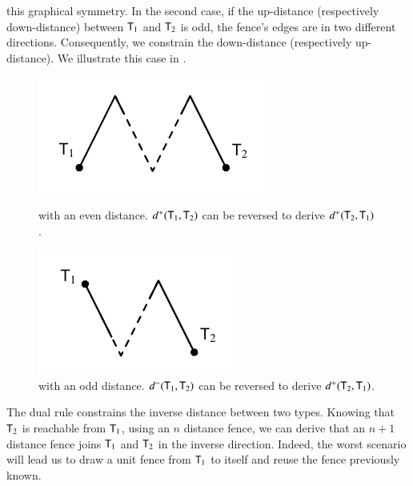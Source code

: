 \documentclass{report}
\begin{document}
  this graphical symmetry. In the second case, if the up-distance
  (respectively down-distance) between $\textsf{T}_1$ and $\textsf{T}_2$ is odd, the fence's edges
  are in two different directions. Consequently, we constrain the down-distance (respectively
  up-distance). We illustrate this case in .
  \begin{figure}[ht]
    \centering
    \begin{minipage}[b]{0.4\linewidth}
      \centering
      \includegraphics{images/dcsymm_even}
      \caption{\dcsymm with an even distance.
        $d^+(\textsf{T}_1,\textsf{T}_2)$ can be reversed to derive $d^+(\textsf{T}_2,\textsf{T}_1)$.}
    \end{minipage}
    \begin{minipage}[b]{0.2\linewidth}
      \centering
      \hole
    \end{minipage}
    \begin{minipage}[b]{0.4\linewidth}
      \centering
      \includegraphics{images/dcsymm_odd}
      \caption{\dcsymm with an odd distance.
        $d^-(\textsf{T}_1,\textsf{T}_2)$ can be reversed to derive $d^+(\textsf{T}_2,\textsf{T}_1)$.}
    \end{minipage}
  \end{figure}
  The dual rule \dcdual constrains the inverse distance between two types. Knowing that $\textsf{T}_2$
  is reachable from $\textsf{T}_1$, using an $n$ distance fence, we can derive that an
  $n+1$ distance fence joins $\textsf{T}_1$ and $\textsf{T}_2$ in the inverse direction. Indeed,
  the worst scenario will lead us to draw a unit fence from $\textsf{T}_1$ to itself and
  reuse the fence previously known.
  
\end{document}
